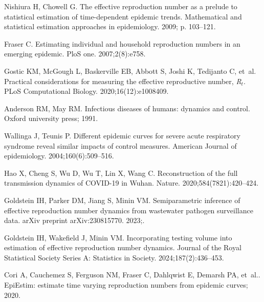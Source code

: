 \documentclass[10pt,letterpaper]{article}
\begin{document}
\begin{thebibliography}{10}

  Nishiura H, Chowell G.
  \newblock The effective reproduction number as a prelude to statistical
    estimation of time-dependent epidemic trends.
  \newblock Mathematical and statistical estimation approaches in epidemiology.
    2009; p. 103--121.
  
  Fraser C.
  \newblock Estimating individual and household reproduction numbers in an
    emerging epidemic.
  \newblock PloS one. 2007;2(8):e758.
  
  Gostic KM, McGough L, Baskerville EB, Abbott S, Joshi K, Tedijanto C, et~al.
  \newblock Practical considerations for measuring the effective reproductive
    number, \emph{R}$_t$.
  \newblock PLoS Computational Biology. 2020;16(12):e1008409.
  
  Anderson RM, May RM.
  \newblock Infectious diseases of humans: dynamics and control.
  \newblock Oxford university press; 1991.
  
  Wallinga J, Teunis P.
  \newblock Different epidemic curves for severe acute respiratory syndrome
    reveal similar impacts of control measures.
  \newblock American Journal of epidemiology. 2004;160(6):509--516.
  
  Hao X, Cheng S, Wu D, Wu T, Lin X, Wang C.
  \newblock Reconstruction of the full transmission dynamics of COVID-19 in
    Wuhan.
  \newblock Nature. 2020;584(7821):420--424.
  
  Goldstein IH, Parker DM, Jiang S, Minin VM.
  \newblock Semiparametric inference of effective reproduction number dynamics
    from wastewater pathogen surveillance data.
  \newblock arXiv preprint arXiv:230815770. 2023;.
  
  Goldstein IH, Wakefield J, Minin VM.
  \newblock Incorporating testing volume into estimation of effective
    reproduction number dynamics.
  \newblock Journal of the Royal Statistical Society Series A: Statistics in
    Society. 2024;187(2):436--453.
  
  Cori A, Cauchemez S, Ferguson NM, Fraser C, Dahlqwist E, Demarsh PA, et~al..
    {EpiEstim}: estimate time varying reproduction numbers from epidemic curves;
    2020.
  

\end{thebibliography}
\end{document}
